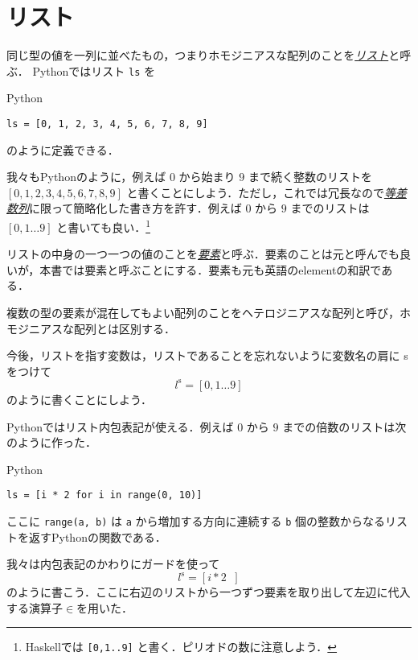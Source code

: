 \documentclass[a4paper,draft]{jsbook}
\newcommand{\programminglanguage}[1]{\textsf{#1}}
\newcommand{\haskell}{\programminglanguage{Haskell}}
\newcommand{\python}{\programminglanguage{Python}}
\newcommand{\keyword}[1]{{\underline{\emph{#1}}}}
\newcommand{\code}[1]{\texttt{#1}}
\newenvironment{pythoncode}{\begin{itembox}[r]{\python}}{\end{itembox}}
\newcommand{\mListWith}[1]{\left[#1\right]}
\newcommand{\mList}[1]{{#1}^\mathrm{s}}
\newcommand{\mGuard}[1]{\mathop{\mid_{#1}}}
\DeclareMathOperator{\mFrom}{\in}
\begin{document}
\section{リスト}

同じ型の値を一列に並べたもの，つまりホモジニアスな配列のことを\keyword{リスト}と呼ぶ．
\python ではリスト \code{ls} を
\begin{pythoncode}
\begin{verbatim}
ls = [0, 1, 2, 3, 4, 5, 6, 7, 8, 9]
\end{verbatim}
\end{pythoncode}
のように定義できる．

我々も\python のように，例えば $0$ から始まり $9$ まで続く整数のリストを $[0,1,2,3,4,5,6,7,8,9]$ と書くことにしよう．ただし，これでは冗長なので\keyword{等差数列}に限って簡略化した書き方を許す．例えば $0$ から $9$ までのリストは $\mListWith{0,1\dots9}$ と書いても良い．\footnote{\haskell では \code{[0,1..9]} と書く．ピリオドの数に注意しよう．}

リストの中身の一つ一つの値のことを\keyword{要素}と呼ぶ．要素のことは元と呼んでも良いが，本書では要素と呼ぶことにする．要素も元も英語のelementの和訳である．

複数の型の要素が混在してもよい配列のことをヘテロジニアスな配列と呼び，ホモジニアスな配列とは区別する．

今後，リストを指す変数は，リストであることを忘れないように変数名の肩に s をつけて
\begin{equation}
\mList{l}=\mListWith{0,1\dots9}
\end{equation}
のように書くことにしよう．

\python ではリスト内包表記が使える．例えば $0$ から $9$ までの倍数のリストは次のように作った．
\begin{pythoncode}
\begin{verbatim}
ls = [i * 2 for i in range(0, 10)]
\end{verbatim}
\end{pythoncode}
ここに \code{range(a, b)} は \code{a} から増加する方向に連続する \code{b} 個の整数からなるリストを返す\python の関数である．

我々は内包表記のかわりにガードを使って
\begin{equation}
\mList{l}=\mListWith{i*2\mGuard{i\mFrom{\mListWith{0,1\dots9}}}}
\end{equation}
のように書こう．ここに右辺のリストから一つずつ要素を取り出して左辺に代入する演算子$\mFrom$を用いた．
\end{document}
